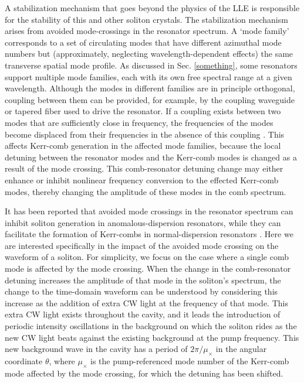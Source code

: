 A stabilization mechanism that goes beyond the physics of the LLE is responsible for the stability of this and other soliton crystals. The stabilization mechanism arises from avoided mode-crossings in the resonator spectrum. A `mode family' corresponds to a set of circulating modes that have different azimuthal mode numbers but (approximately, neglecting wavelength-dependent effects) the same transverse spatial mode profile. As discussed in Sec. \ref{something}, some resonators support multiple mode families, each with its own free spectral range at a given wavelength. Although the modes in different families are in principle orthogonal, coupling between them can be provided, for example, by the coupling waveguide or tapered fiber used to drive the resonator. If a coupling exists between two modes that are sufficiently close in frequency, the frequencies of the modes become displaced from their frequencies in the absence of this coupling \cite{Haus1991}. This affects Kerr-comb generation in the affected mode families, because the local detuning between the resonator modes and the Kerr-comb modes is changed as a result of the mode crossing. This comb-resonator detuning change may either enhance or inhibit nonlinear frequency conversion to the effected Kerr-comb modes, thereby changing the amplitude of these modes in the comb spectrum. 

It has been reported that avoided mode crossings in the resonator spectrum can inhibit soliton generation in anomalous-dispersion resonators\cite{4,6}, while they can facilitate the formation of Kerr-combs in normal-dispersion resonators\cite{37} . Here we are interested specifically in the impact of the avoided mode crossing on the waveform of a soliton. For simplicity, we focus on the case where a single comb mode is affected by the mode crossing. When the change in the comb-resonator detuning increases the amplitude of that mode in the soliton's spectrum, the change to the time-domain waveform can be understood by considering this increase as the addition of extra CW light at the frequency of that mode. This extra CW light exists throughout the cavity, and it leads the introduction of periodic intensity oscillations in the background on which the soliton rides as the new CW light beats against the existing background at the pump frequency. This new background wave in the cavity has a period of $2\pi/\mu_\times$ in the angular coordinate $\theta$, where $\mu_\times$ is the pump-referenced mode number of the Kerr-comb mode affected by the mode crossing, for which the detuning has been shifted. 

